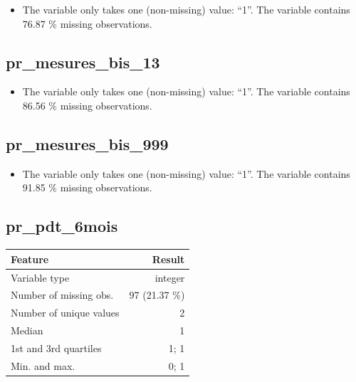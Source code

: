 \documentclass[
  letterpaper,
  DIV=11,
  numbers=noendperiod]{scrartcl}
\providecommand{\tightlist}{%
  \setlength{\itemsep}{0pt}\setlength{\parskip}{0pt}}
\begin{document}
\begin{itemize}
\tightlist
\item
  The variable only takes one (non-missing) value: ``1''. The variable
  contains 76.87 \% missing observations.
\end{itemize}

\fullline

\subsection{pr\_mesures\_bis\_13}\label{pr_mesures_bis_13}

\begin{itemize}
\tightlist
\item
  The variable only takes one (non-missing) value: ``1''. The variable
  contains 86.56 \% missing observations.
\end{itemize}

\fullline

\subsection{pr\_mesures\_bis\_999}\label{pr_mesures_bis_999}

\begin{itemize}
\tightlist
\item
  The variable only takes one (non-missing) value: ``1''. The variable
  contains 91.85 \% missing observations.
\end{itemize}

\fullline

\subsection{pr\_pdt\_6mois}\label{pr_pdt_6mois}

\bminione

\begin{longtable}[]{@{}lr@{}}
\toprule\noalign{}
Feature & Result \\
\midrule\noalign{}
\endhead
\bottomrule\noalign{}
\endlastfoot
Variable type & integer \\
Number of missing obs. & 97 (21.37 \%) \\
Number of unique values & 2 \\
Median & 1 \\
1st and 3rd quartiles & 1; 1 \\
Min. and max. & 0; 1 \\
\end{longtable}
\end{document}
